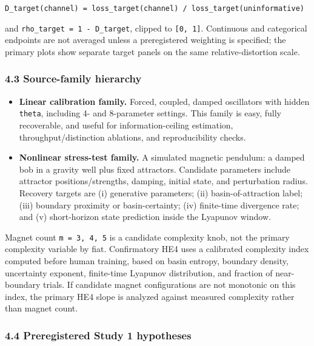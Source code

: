 \documentclass[
  11pt,
]{article}
\providecommand{\tightlist}{%
  \setlength{\itemsep}{0pt}\setlength{\parskip}{0pt}}
\begin{document}
\texttt{D\_target(channel)\ =\ loss\_target(channel)\ /\ loss\_target(uninformative)}

and \texttt{rho\_target\ =\ 1\ -\ D\_target}, clipped
to \texttt{{[}0,\ 1{]}}. Continuous and categorical
endpoints are not averaged unless a preregistered
weighting is specified; the primary plots show separate
target panels on the same relative-distortion scale.

\subsubsection{4.3 Source-family
hierarchy}\label{source-family-hierarchy}

\begin{itemize}
\tightlist
\item
  \textbf{Linear calibration family.} Forced, coupled,
  damped oscillators with hidden \texttt{theta},
  including 4- and 8-parameter settings. This family is
  easy, fully recoverable, and useful for
  information-ceiling estimation,
  throughput/distinction ablations, and reproducibility
  checks.
\item
  \textbf{Nonlinear stress-test family.} A simulated
  magnetic pendulum: a damped bob in a gravity well
  plus fixed attractors. Candidate parameters include
  attractor positions/strengths, damping, initial
  state, and perturbation radius. Recovery targets are
  (i) generative parameters; (ii) basin-of-attraction
  label; (iii) boundary proximity or basin-certainty;
  (iv) finite-time divergence rate; and (v)
  short-horizon state prediction inside the Lyapunov
  window.
\end{itemize}

Magnet count \texttt{m\ =\ 3,\ 4,\ 5} is a candidate
complexity knob, not the primary complexity variable by
fiat. Confirmatory HE4 uses a calibrated complexity
index computed before human training, based on basin
entropy, boundary density, uncertainty exponent,
finite-time Lyapunov distribution, and fraction of
near-boundary trials. If candidate magnet
configurations are not monotonic on this index, the
primary HE4 slope is analyzed against measured
complexity rather than magnet count.

\subsubsection{4.4 Preregistered Study 1
hypotheses}\label{preregistered-study-1-hypotheses}
\end{document}
